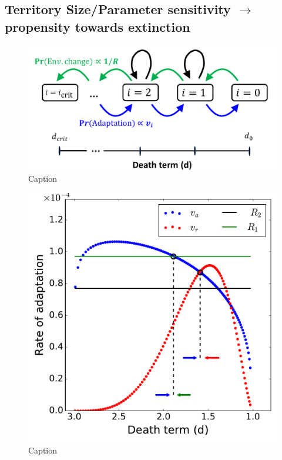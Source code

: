 \documentclass[9pt,twocolumn,twoside]{article}
\begin{document}
\subsection{Territory Size/Parameter sensitivity $\rightarrow$ propensity towards extinction}
\begin{figure}[!h]
    \centering
    \includegraphics[scale=0.33]{fig_MC_chain_diagram.pdf}
    \caption{Caption}
    \label{fig:my_label}
\end{figure}
\begin{figure}[!h]
    \centering
    \includegraphics[scale=0.45]{fig_AbsVsRel_MC_chain.pdf}
    \caption{Caption}
    \label{fig:my_label}
\end{figure}
\end{document}
